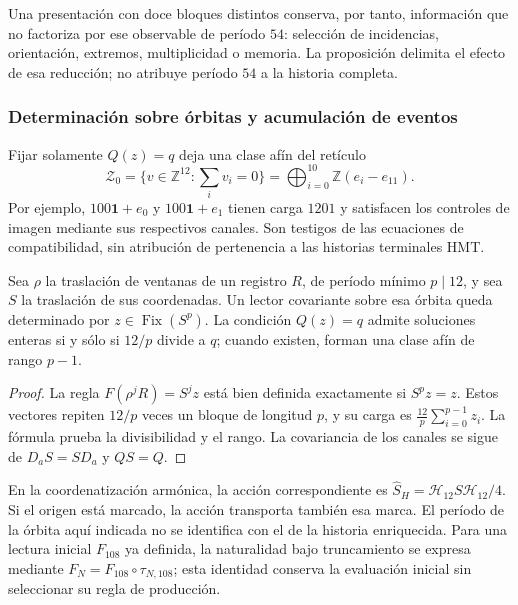 Una presentación con doce bloques distintos conserva, por tanto,
información que no factoriza por ese observable de período $54$:
selección de incidencias, orientación, extremos, multiplicidad o
memoria. La proposición delimita el efecto de esa reducción; no
atribuye período $54$ a la historia completa.

\subsubsection{Determinación sobre órbitas y acumulación de eventos}

Fijar solamente $Q(z)=q$ deja una clase afín del retículo
\[
 \mathcal Z_0=\{v\in\mathbb Z^{12}:\sum_i v_i=0\}
 =\bigoplus_{i=0}^{10}\mathbb Z(e_i-e_{11}).
\]
Por ejemplo, $100\mathbf1+e_0$ y $100\mathbf1+e_1$ tienen
carga $1201$ y satisfacen los controles de imagen mediante sus
respectivos canales. Son testigos de las ecuaciones de compatibilidad,
sin atribución de pertenencia a las historias terminales HMT.

\begin{proposition}
\label{iii:r25:covariancia}
Sea $\rho$ la traslación de ventanas de un registro $R$, de
período mínimo $p\mid12$, y sea $S$ la traslación de sus
coordenadas. Un lector covariante sobre esa órbita queda determinado
por $z\in\operatorname{Fix}(S^p)$. La condición $Q(z)=q$
admite soluciones enteras si y sólo si $12/p$ divide a $q$;
cuando existen, forman una clase afín de rango $p-1$.
\end{proposition}
\begin{proof}
La regla $F(\rho^jR)=S^jz$ está bien definida exactamente si
$S^pz=z$. Estos vectores repiten $12/p$ veces un bloque de
longitud $p$, y su carga es $\frac{12}{p}\sum_{i=0}^{p-1}z_i$.
La fórmula prueba la divisibilidad y el rango. La covariancia de
los canales se sigue de $D_aS=SD_a$ y $QS=Q$.
\end{proof}

En la coordenatización armónica, la acción correspondiente es
$\widehat S_H=\mathcal H_{12}S\mathcal H_{12}/4$.
Si el origen está marcado, la acción transporta también esa marca.
El período de la órbita aquí indicada no se identifica con el de
la historia enriquecida. Para una lectura inicial $F_{108}$ ya
definida, la naturalidad bajo truncamiento se expresa mediante
$F_N=F_{108}\circ\tau_{N,108}$; esta identidad conserva la
evaluación inicial sin seleccionar su regla de producción.

